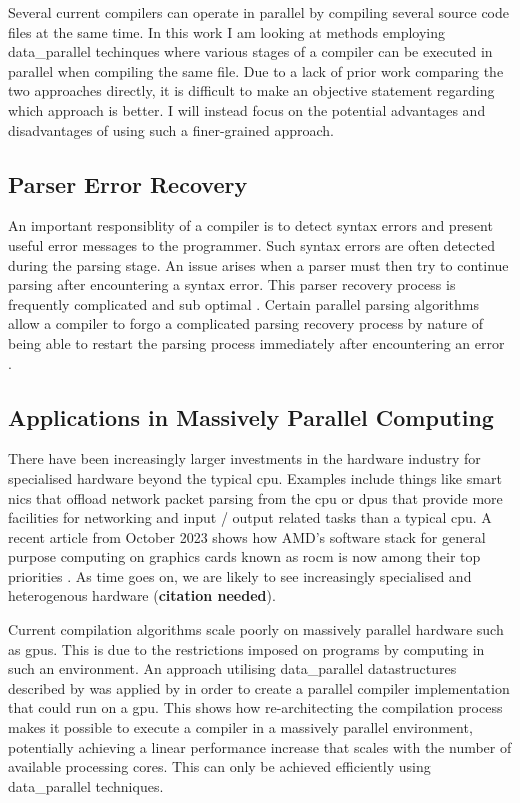 Several current compilers can operate in parallel by compiling several source
code files at the same time. In this work I am looking at methods employing
\gls{data_parallel} techinques where various stages of a compiler can be executed in
parallel when compiling the same file. Due to a lack of prior work comparing
the two approaches directly, it is difficult to make an objective statement
regarding which approach is better. I will instead focus on the potential
advantages and disadvantages of using such a finer-grained approach.

\subsection{Parser Error Recovery}

An important responsiblity of a compiler is to detect syntax errors and
present useful error messages to the programmer. Such syntax errors are often
detected during the parsing stage. An issue arises when a parser must then try
to continue parsing after encountering a syntax error. This parser recovery
process is frequently complicated and sub optimal \citep{medeiros_syntax_2018,
hutchison_pika_2020}. Certain parallel parsing algorithms allow a compiler
to forgo a complicated parsing recovery process by nature of being able
to restart the parsing process immediately after encountering an error
\citep{clarke_error_1993}.

\subsection{Applications in Massively Parallel Computing}

There have been increasingly larger investments in the hardware industry for
specialised hardware beyond the typical \ac{cpu}. Examples include things like smart
nics that offload network packet parsing from the \ac{cpu} or \ac{dpu}s that provide
more facilities for networking and input / output related tasks than a typical
\ac{cpu}. A recent article from October 2023 shows how AMD’s software stack for
general purpose computing on graphics cards known as rocm is now among their
top priorities \citep{ward-foxton_rocm_2023}. As time goes on, we are likely
to see increasingly specialised and heterogenous hardware (\textbf{citation
needed}).

Current compilation algorithms scale poorly on massively parallel hardware
such as \ac{gpu}s. This is due to the restrictions imposed on programs by
computing in such an environment. An approach utilising \gls{data_parallel}
datastructures described by \cite{hillis_data_1986} was applied by
\cite{voetter_compilation_2022} in order to create a parallel compiler
implementation that could run on a \ac{gpu}. This shows how  re-architecting
the compilation process makes it possible to execute a compiler in a massively
parallel environment, potentially achieving a linear performance increase that
scales with the number of available processing cores. This can only be achieved
efficiently using \gls{data_parallel} techniques.

